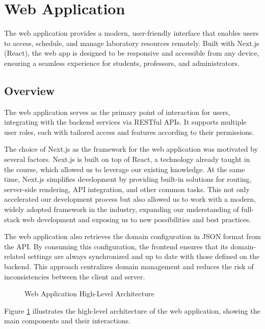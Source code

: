\section{Web Application}

The web application provides a modern, user-friendly interface that enables users to access, schedule, and manage laboratory resources remotely. Built with Next.js (React), the web app is designed to be responsive and accessible from any device, ensuring a seamless experience for students, professors, and administrators.

\subsection{Overview}
The web application serves as the primary point of interaction for users, integrating with the backend services via RESTful APIs. It supports multiple user roles, each with tailored access and features according to their permissions.

The choice of Next.js as the framework for the web application was motivated by several factors. Next.js is built on top of React, a technology already taught in the course, which allowed us to leverage our existing knowledge. At the same time, Next.js simplifies development by providing built-in solutions for routing, server-side rendering, API integration, and other common tasks. This not only accelerated our development process but also allowed us to work with a modern, widely adopted framework in the industry, expanding our understanding of full-stack web development and exposing us to new possibilities and best practices.

The web application also retrieves the domain configuration in JSON format from the API. By consuming this configuration, the frontend ensures that its domain-related settings are always synchronized and up to date with those defined on the backend. This approach centralizes domain management and reduces the risk of inconsistencies between the client and server.

\begin{figure}[H]
    \begin{center}
        \resizebox{15cm}{!}{}
    \end{center}
    \caption{Web Application High-Level Architecture}
    \label{fig:webapp_simple_architecture}
\end{figure}

Figure \ref{fig:webapp_simple_architecture} illustrates the high-level architecture of the web application, showing the main components and their interactions.

